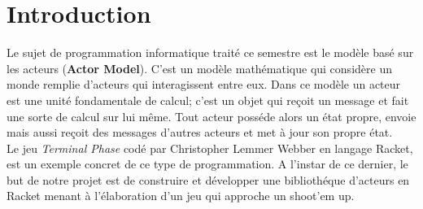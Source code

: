 \section{Introduction}

Le sujet de programmation  informatique traité ce semestre est le modèle basé sur les acteurs (\textbf{Actor Model}). C'est un modèle mathématique qui considère un monde remplie d'acteurs qui interagissent entre eux. Dans ce modèle un acteur est une unité fondamentale de calcul; c'est un objet qui reçoit un message et fait une sorte de calcul sur lui même. Tout acteur posséde alors un état propre, envoie mais aussi reçoit des messages d'autres acteurs et met à jour son propre état. \\
Le jeu \textit{Terminal Phase} codé par Christopher Lemmer Webber en langage Racket, est un exemple concret de ce type de programmation.
A l'instar de ce dernier, le but de notre projet est de construire et développer une bibliothéque d'acteurs en Racket menant à l'élaboration d'un jeu qui approche un shoot'em up. 